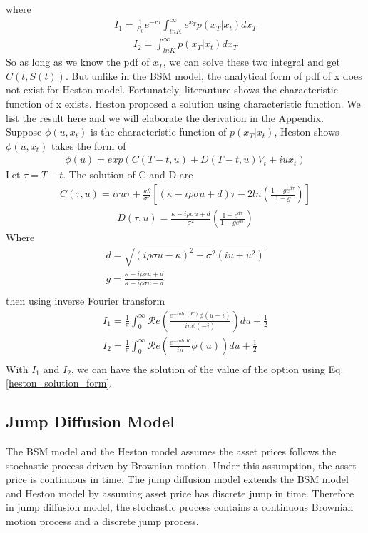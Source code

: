 \documentclass[a4paper]{article}
\begin{document}
where 
\begin{align}
	I_1 = \frac{1}{S_0} e^{-r \tau}\int_{lnK}^{\infty} e^{x_T} p(x_T | x_t) dx_T \label{I_1}
\end{align}
\begin{align}
	I_2 = \int_{lnK}^{\infty}  p(x_T | x_t) dx_T \label{I_2}
\end{align}
So as long as we know the pdf of $x_T$, we can solve these two integral and get $C(t, S(t))$. But unlike in the BSM model, the analytical form of pdf of x does not exist for Heston model. Fortunately, literauture shows the characteristic function of x exists. Heston \cite{heston} proposed a solution using characteristic function. We list the result here and we will elaborate the derivation in the Appendix. \\
Suppose $\phi(u, x_t)$ is the characteristic function of $p(x_T| x_t)$, Heston shows $\phi(u,x_t)$ takes the form of
\begin{align}
	\phi(u) = exp(C(T-t, u) + D(T-t, u)V_t + iux_t) \label{heston_characteristic}
\end{align}
Let $\tau = T - t$. The solution of C and D are
\begin{align} 
	C(\tau, u) = iru\tau + \frac{\kappa \theta}{\sigma^2}
	[(\kappa - i\rho \sigma u + d)\tau - 2ln(\frac{1 - g e^{d\tau}}{1 - g})] \label{heston_C}
\end{align}
\begin{align} 
	D(\tau, u) = \frac{\kappa - i\rho \sigma u + d}{\sigma^2} (\frac{1 - e^{d\tau}}{1-ge^{d\tau}})
		\label{heston_D}
\end{align}
Where
\begin{align*}
	d = \sqrt{(i\rho \sigma u - \kappa)^2 + \sigma^2(i  u + u^2)} \\
	g = \frac{\kappa - i \rho \sigma u + d}{\kappa - i \rho \sigma u -d} \\
\end{align*}
then using inverse Fourier transform
\begin{align*}
	I_1 = \frac{1}{\pi} \int_{0}^{\infty}\mathcal Re(\frac{e^{-iuln(K)}\phi(u-i)}{iu\phi(-i)})du +\frac{1}{2} \\
	I_2 = \frac{1}{\pi} \int_{0}^{\infty}\mathcal Re( \frac{e^{-i u lnK}}{iu} \phi(u))  du + \frac{1}{2} \\
\end{align*}
With $I_1$ and $I_2$, we can have the solution of the value of the option using Eq. \ref{heston_solution_form}.
\subsection{Jump Diffusion Model}
The BSM model and the Heston model assumes the asset prices follows the stochastic process driven by Brownian motion. Under this assumption, the asset price is continuous in time. The jump diffusion model extends the BSM model and Heston model by assuming asset price has discrete jump in time. Therefore in jump diffusion model, the stochastic process contains a continuous Brownian motion process and a discrete jump process.\\
\end{document}
